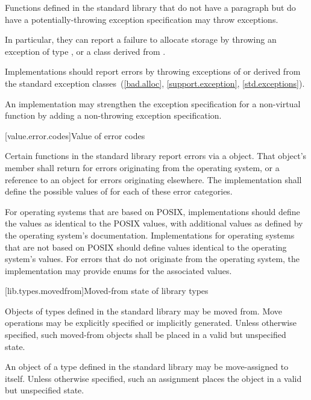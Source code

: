 \pnum
Functions defined in the
\Cpp{} standard library
%
that do not have a \throws paragraph
but do have a potentially-throwing exception specification
may throw  exceptions.
\begin{footnote}
In particular, they
can report a failure to allocate storage by throwing an exception of type
,
or a class derived from
.
\end{footnote}
Implementations should
report errors by throwing exceptions of or derived
from the standard exception classes~(\ref{bad.alloc},
\ref{support.exception}, \ref{std.exceptions}).

\pnum
An implementation may strengthen the
exception specification
for a non-virtual function
by adding a non-throwing exception specification.

[value.error.codes]{Value of error codes}

\pnum
Certain functions in the \Cpp{} standard library report errors via a
 object. That object's
 member shall return  for
errors originating from the operating system, or a reference to an
  object for errors originating elsewhere.
The implementation shall define the possible values of  for each of these
error categories.
\begin{example}
For operating systems that are based on POSIX,
implementations should define the  values as
identical to the POSIX  values, with additional values as defined by the
operating system's documentation. Implementations for operating systems that are not
based on POSIX should define values identical to the operating system's
values. For errors that do not originate from the operating system, the implementation
may provide enums for the associated values.
\end{example}

[lib.types.movedfrom]{Moved-from state of library types}

\pnum
Objects of types defined in the \Cpp{} standard library may be moved
from. Move operations may be explicitly specified or
implicitly generated. Unless otherwise specified, such moved-from objects shall
be placed in a valid but unspecified state.

\pnum
An object of a type defined in the \Cpp{} standard library may be
move-assigned to itself.
Unless otherwise specified, such an assignment places the object in
a valid but unspecified state.
